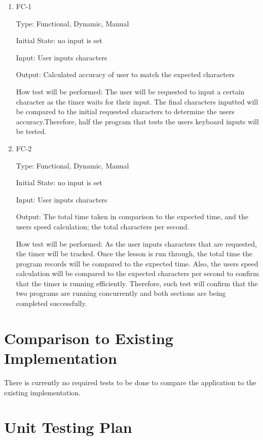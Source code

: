 \documentclass[12pt, titlepage]{article}
\begin{document}
\begin{enumerate}

\item{FC-1\\}

Type: Functional, Dynamic, Manual
					
Initial State: no input is set
					
Input: User inputs characters
					
Output: Calculated accuracy of user to match the expected characters
					
How test will be performed: The user will be requested to input a certain character as the timer waits for their input. The final characters inputted will be compared to the initial requested characters to determine the users accuracy.Therefore, half the program that tests the users keyboard inputs will be tested. 
					
\item{FC-2\\}

Type: Functional, Dynamic, Manual
					
Initial State: no input is set
					
Input: User inputs characters
					
Output: The total time taken in comparison to the expected time, and the users speed calculation; the total characters per second.
					
How test will be performed: As the user inputs characters that are requested, the timer will be tracked. Once the lesson is run through, the total time the program records will be compared to the expected time. Also, the users speed calculation will be compared to the expected characters per second to confirm that the timer is running efficiently. Therefore, such test will confirm that the two programs are running concurrently and both sections are being completed successfully.

\end{enumerate}

	
\section{Comparison to Existing Implementation}	
There is currently no required tests to be done to compare the application to the existing implementation.
				
\section{Unit Testing Plan}
\end{document}
